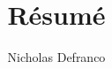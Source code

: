 \documentclass{article}
\begin{document}
\title{R\'esum\'e}
\author{Nicholas Defranco}

\maketitle
\end{document}

